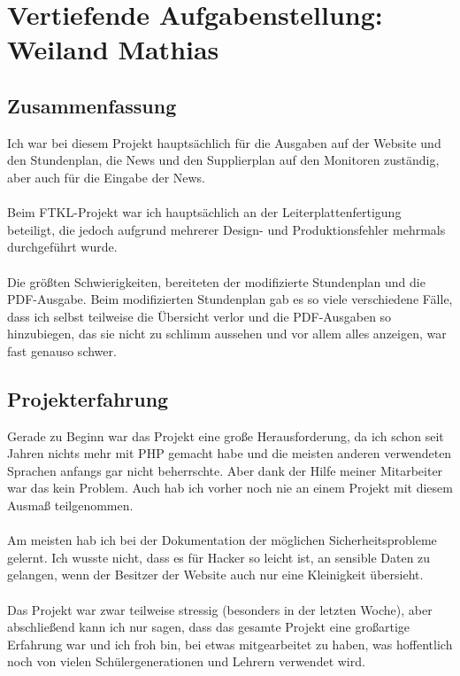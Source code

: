 \chapter[Weiland]{Vertiefende Aufgabenstellung: \\Weiland Mathias}

\section{Zusammenfassung}
Ich war bei diesem Projekt hauptsächlich für die Ausgaben auf der Website und den Stundenplan, die News und den Supplierplan auf den Monitoren zuständig, aber auch für die Eingabe der News. \\\\
Beim FTKL-Projekt war ich hauptsächlich an der Leiterplattenfertigung beteiligt, die jedoch aufgrund mehrerer Design- und Produktionsfehler mehrmals durchgeführt wurde.\\\\
Die größten Schwierigkeiten, bereiteten der modifizierte Stundenplan und die PDF-Ausgabe. Beim modifizierten Stundenplan gab es so viele verschiedene Fälle, dass ich selbst teilweise die Übersicht verlor und die PDF-Ausgaben so hinzubiegen, das sie nicht zu schlimm aussehen und vor allem alles anzeigen, war fast genauso schwer.
\section{Projekterfahrung}
Gerade zu Beginn war das Projekt eine große Herausforderung, da ich schon seit Jahren nichts mehr mit PHP gemacht habe und die meisten anderen verwendeten Sprachen anfangs gar nicht beherrschte. Aber dank der Hilfe meiner Mitarbeiter war das kein Problem. Auch hab ich vorher noch nie an einem Projekt mit diesem Ausmaß teilgenommen.\\\\
Am meisten hab ich bei der Dokumentation der möglichen Sicherheitsprobleme gelernt. Ich wusste nicht, dass es für Hacker so leicht ist, an sensible Daten zu gelangen, wenn der Besitzer der Website auch nur eine Kleinigkeit übersieht.\\\\
Das Projekt war zwar teilweise stressig (besonders in der letzten Woche), aber abschließend kann ich nur sagen, dass das gesamte Projekt eine großartige Erfahrung war und ich froh bin, bei etwas mitgearbeitet zu haben, was hoffentlich noch von vielen Schülergenerationen und Lehrern verwendet wird.